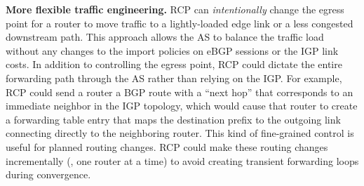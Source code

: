 {\bf More flexible traffic engineering.}  RCP can
{\em intentionally\/} change the egress point for a router to move
traffic to a lightly-loaded edge link or a less congested downstream
path.  This approach allows the AS to balance the traffic load without any
changes to the import policies on eBGP sessions or the IGP link costs.
In addition to controlling the egress point, RCP could
dictate the entire forwarding path through the AS rather
than relying on the IGP.  For example, RCP could send a router a
BGP route with a ``next hop'' that corresponds to an immediate
neighbor in the IGP topology, which would cause that router to create a
forwarding table entry that maps the destination prefix to the
outgoing link connecting directly to the neighboring router.  
This
kind of fine-grained control is useful for planned routing changes.
RCP could make these routing
changes incrementally (\ie, one router at a time) to avoid creating transient
forwarding loops during convergence.




